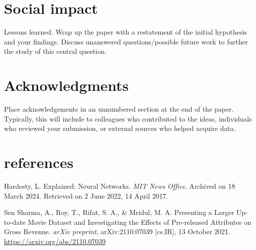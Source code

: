 \documentclass{article}
\begin{document}
\section{Social impact}
\label{conclusion}

Lessons learned.  Wrap up the paper with a restatement of the initial hypothesis
and your findings.  Discuss unanswered questions/possible future work to further
the study of this central question.

\section*{Acknowledgments}


Place acknowledgements in an unnumbered section at the
end of the paper. Typically, this will include
to colleagues who contributed to the ideas, individuals who
reviewed your submission, or external sources who helped
acquire data.

\section*{references}
\begin{hangparas}{.25in}{1} %
\hypertarget{Hardesty2017}{Hardesty, L. Explained: Neural Networks. \textit{MIT News Office}. Archived on 18 March 2024. Retrieved on 2 June 2022, 14 April 2017.}
\end{hangparas}
\begin{hangparas}{.25in}{1}
\hypertarget{SenSharma2021}{Sen Sharma, A., Roy, T., Rifat, S. A., \& Mridul, M. A. Presenting a Larger Up-to-date Movie Dataset and Investigating the Effects of Pre-released Attributes on Gross Revenue. \textit{arXiv preprint}, arXiv:2110.07039 [cs.IR], 13 October 2021. \url{https://arxiv.org/abs/2110.07039}}

\end{hangparas}



\end{document}
